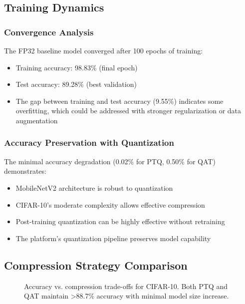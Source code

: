 \subsection{Training Dynamics}

\subsubsection{Convergence Analysis}

The FP32 baseline model converged after 100 epochs of training:
\begin{itemize}
\item Training accuracy: 98.83\% (final epoch)
\item Test accuracy: 89.28\% (best validation)
\item The gap between training and test accuracy (9.55\%) indicates some overfitting, which could be addressed with stronger regularization or data augmentation
\end{itemize}

\subsubsection{Accuracy Preservation with Quantization}

The minimal accuracy degradation (0.02\% for PTQ, 0.50\% for QAT) demonstrates:
\begin{itemize}
\item MobileNetV2 architecture is robust to quantization
\item CIFAR-10's moderate complexity allows effective compression
\item Post-training quantization can be highly effective without retraining
\item The platform's quantization pipeline preserves model capability
\end{itemize}

\subsection{Compression Strategy Comparison}

\begin{figure}[h]
\centering
\resizebox{0.48\textwidth}{!}{}
\caption{Accuracy vs. compression trade-offs for CIFAR-10. Both PTQ and QAT maintain >88.7\% accuracy with minimal model size increase.}
\label{fig:cifar_results}
\end{figure}

